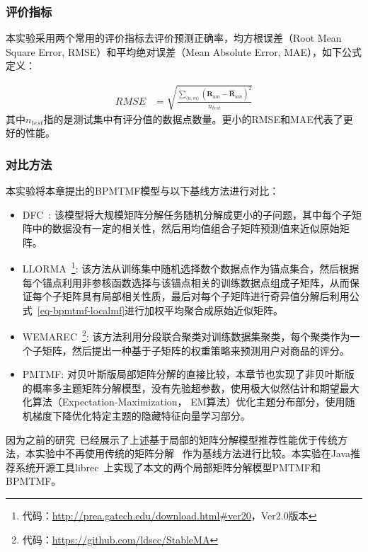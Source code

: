 \subsubsection{评价指标}
本实验采用两个常用的评价指标去评价预测正确率，均方根误差（Root Mean Square Error, RMSE）和平均绝对误差（Mean Absolute Error, MAE），如下公式定义：

\begin{align}
	RMSE &= \sqrt{\frac{\sum_{\langle u,m\rangle}(\mathbf{R}_{um}-\hat{\mathbf{R}}_{um})^2}{n_{test}}}
\end{align}
其中$n_{test}$指的是测试集中有评分值的数据点数量。更小的RMSE和MAE代表了更好的性能。
\subsubsection{对比方法}
本实验将本章提出的BPMTMF模型与以下基线方法进行对比：

\begin{itemize}
	\item DFC~\cite{MJT11}:  该模型将大规模矩阵分解任务随机分解成更小的子问题，其中每个子矩阵中的数据没有一定的相关性，然后用均值组合子矩阵预测值来近似原始矩阵。
	\item LLORMA~\cite{lee2013local}\footnote{代码：\url{http://prea.gatech.edu/download.html\#ver20}，Ver2.0版本}: 该方法从训练集中随机选择数个数据点作为锚点集合，然后根据每个锚点利用非参核函数选择与该锚点相关的训练数据点组成子矩阵，从而保证每个子矩阵具有局部相关性质，最后对每个子矩阵进行奇异值分解后利用公式~\ref{eq-bpmtmf-localmf}进行加权平均聚合成原始近似矩阵。
	\item WEMAREC~\cite{chen2015wemarec}\footnote{代码：\url{https://github.com/ldscc/StableMA}}: 该方法利用分段联合聚类对训练数据集聚类，每个聚类作为一个子矩阵，然后提出一种基于子矩阵的权重策略来预测用户对商品的评分。
	\item PMTMF: 对贝叶斯版局部矩阵分解的直接比较，本章节也实现了非贝叶斯版的概率多主题矩阵分解模型，没有先验超参数，使用极大似然估计和期望最大化算法（Expectation-Maximization， EM算法）优化主题分布部分，使用随机梯度下降优化特定主题的隐藏特征向量学习部分。
\end{itemize}

因为之前的研究~\cite{MJT11,lee2013local,chen2015wemarec}已经展示了上述基于局部的矩阵分解模型推荐性能优于传统方法，本实验中不再使用传统的矩阵分解~\cite{MS07,koren2009matrix} 作为基线方法进行比较。本实验在Java推荐系统开源工具librec~\cite{guo2015librec}上实现了本文的两个局部矩阵分解模型PMTMF和BPMTMF。

